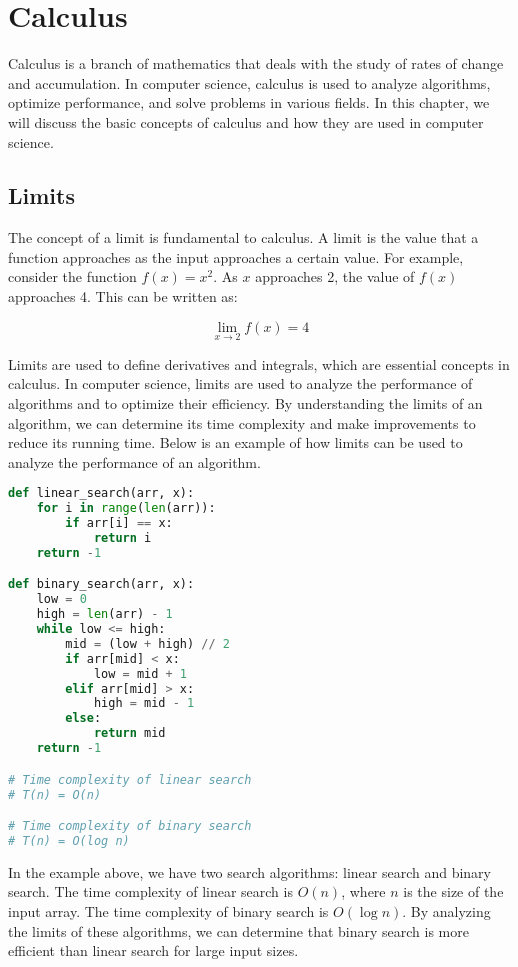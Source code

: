 \chapter{Calculus}
Calculus is a branch of mathematics that deals with the study of rates of change and accumulation. In computer science, calculus is used to analyze algorithms, optimize performance, and solve problems in various fields. In this chapter, we will discuss the basic concepts of calculus and how they are used in computer science.

\section{Limits}

The concept of a limit is fundamental to calculus. A limit is the value that a function approaches as the input approaches a certain value. For example, consider the function $f(x) = x^2$. As $x$ approaches 2, the value of $f(x)$ approaches 4. This can be written as: 

\[
\lim_{x \to 2} f(x) = 4
\]

Limits are used to define derivatives and integrals, which are essential concepts in calculus. In computer science, limits are used to analyze the performance of algorithms and to optimize their efficiency. By understanding the limits of an algorithm, we can determine its time complexity and make improvements to reduce its running time. Below is an example of how limits can be used to analyze the performance of an algorithm.

\newpage

\begin{lstlisting}[language=Python, caption=Example of using limits to analyze algorithm performance]
def linear_search(arr, x):
    for i in range(len(arr)):
        if arr[i] == x:
            return i
    return -1

def binary_search(arr, x):
    low = 0
    high = len(arr) - 1
    while low <= high:
        mid = (low + high) // 2
        if arr[mid] < x:
            low = mid + 1
        elif arr[mid] > x:
            high = mid - 1
        else:
            return mid
    return -1

# Time complexity of linear search
# T(n) = O(n)

# Time complexity of binary search
# T(n) = O(log n)
\end{lstlisting}

In the example above, we have two search algorithms: linear search and binary search. The time complexity of linear search is $O(n)$, where $n$ is the size of the input array. The time complexity of binary search is $O(\log n)$. By analyzing the limits of these algorithms, we can determine that binary search is more efficient than linear search for large input sizes.

